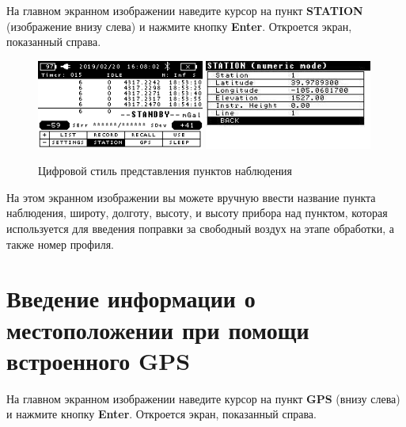 На главном экранном изображении наведите курсор на пункт \textbf{STATION}
(изображение внизу слева) и нажмите кнопку \textbf{Enter}. Откроется экран,
показанный справа.

\begin{figure}[h]
  \centering
  \includegraphics[width=0.49\textwidth]{figures/station_screen_in_numeric_mode_1}
  \includegraphics[width=0.49\textwidth]{figures/station_screen_in_numeric_mode_2}
  \caption{Цифровой стиль представления пунктов наблюдения}
  \label{fig:station_screen_in_numeric_mode}
\end{figure}

На этом экранном изображении вы можете вручную ввести название пункта
наблюдения, широту, долготу, высоту, и высоту прибора над пунктом, которая
используется для введения поправки за свободный воздух на этапе обработки, а
также номер профиля.

\section[Введение местоположения]{Введение информации о местоположении при помощи встроенного GPS}


На главном экранном изображении наведите курсор на пункт \textbf{GPS} (внизу слева) и
нажмите кнопку \textbf{Enter}. Откроется экран, показанный справа.

